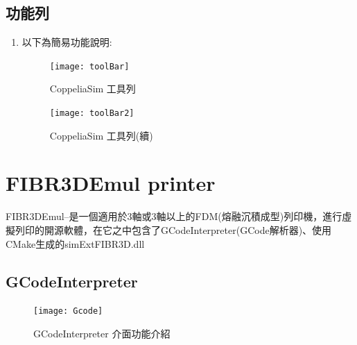 \subsection{功能列}
\begin{enumerate}
\item 以下為簡易功能說明:
\begin{figure}[hbt!]
\center
\texttt{[image: toolBar]}
\caption{\Large CoppeliaSim 工具列}
\texttt{[image: toolBar2]}
\caption{\Large CoppeliaSim 工具列(續)}
\end{figure}
\begin{table}[hbt!]
\center
\large
{}
\caption{\Large 功能說明}
\end{table}
\newpage
\end{enumerate}


\section{FIBR3DEmul printer}
 FIBR3DEmul--是一個適用於3軸或3軸以上的FDM(熔融沉積成型)列印機，進行虛擬列印的開源軟體，在它之中包含了GCodeInterpreter(GCode解析器)、使用CMake生成的simExtFIBR3D.dll\\
 
\subsection{GCodeInterpreter}
\begin{figure}[hbt!]
\begin{center}
\texttt{[image: Gcode]}
\caption{\Large GCodeInterpreter 介面功能介紹}\label{GCode}
\end{center}
\end{figure}
\newpage

